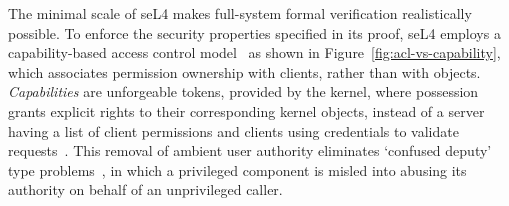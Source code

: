 The minimal scale of seL4 makes full-system formal verification realistically possible. To enforce the security properties specified in its proof, seL4 employs a capability-based access control model~\cite{klein_sel4_2009} as shown in Figure~\ref{fig:acl-vs-capability}, which associates permission ownership with clients, rather than with objects. \textit{Capabilities} are unforgeable tokens, provided by the kernel, where possession grants explicit rights to their corresponding kernel objects, instead of a server having a list of client permissions and clients using credentials to validate requests~\cite{rotondi_managing_2012}. This removal of ambient user authority eliminates `confused deputy' type problems~\cite{hardy_confused_1988}, in which a privileged component is misled into abusing its authority on behalf of an unprivileged caller.

